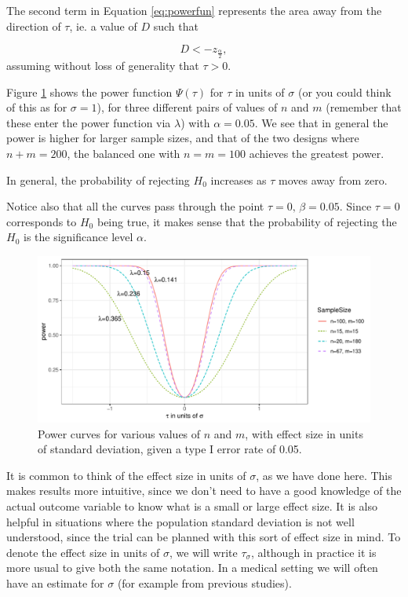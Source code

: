 \documentclass[
  openany]{book}
\theoremstyle{definition}
\theoremstyle{definition}
\theoremstyle{definition}
\theoremstyle{definition}
\theoremstyle{remark}
\begin{document}
The second term in Equation \eqref{eq:powerfun} represents the area away from the direction of \(\tau\), ie. a value of \(D\) such that

\[ D < - z_{\frac{\alpha}{2}},\]
assuming without loss of generality that \(\tau>0\).

Figure \ref{fig:powercurve} shows the power function \(\Psi\left(\tau\right)\) for \(\tau\) in units of \(\sigma\) (or you could think of this as for \(\sigma=1\)), for three different pairs of values of \(n\) and \(m\) (remember that these enter the power function via \(\lambda\)) with \(\alpha=0.05\). We see that in general the power is higher for larger sample sizes, and that of the two designs where \(n+m=200\), the balanced one with \(n=m=100\) achieves the greatest power.

In general, the probability of rejecting \(H_0\) increases as \(\tau\) moves away from zero.

Notice also that all the curves pass through the point \(\tau=0,\,\beta=0.05\). Since \(\tau=0\) corresponds to \(H_0\) being true, it makes sense that the probability of rejecting the \(H_0\) is the significance level \(\alpha\).

\begin{figure}
\centering
\includegraphics{CT4H_notes_files/figure-latex/powercurve-1.pdf}
\caption{\label{fig:powercurve}Power curves for various values of \(n\) and \(m\), with effect size in units of standard deviation, given a type I error rate of 0.05.}
\end{figure}

It is common to think of the effect size in units of \(\sigma\), as we have done here. This makes results more intuitive, since we don't need to have a good knowledge of the actual outcome variable to know what is a small or large effect size. It is also helpful in situations where the population standard deviation is not well understood, since the trial can be planned with this sort of effect size in mind. To denote the effect size in units of \(\sigma\), we will write \(\tau_\sigma\), although in practice it is more usual to give both the same notation. In a medical setting we will often have an estimate for \(\sigma\) (for example from previous studies).
\end{document}
